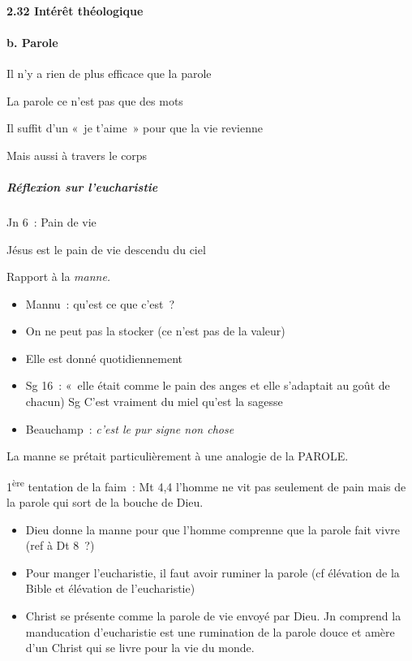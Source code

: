 \hypertarget{intuxe9ruxeat-thuxe9ologique}{%
\paragraph{2.32 Intérêt
théologique}\label{intuxe9ruxeat-thuxe9ologique}}

\hypertarget{b.-parole}{%
\paragraph{b. Parole}\label{b.-parole}}

Il n'y a rien de plus efficace que la parole

La parole ce n'est pas que des mots

Il suffit d'un «~je t'aime~» pour que la vie revienne

Mais aussi à travers le corps

\hypertarget{ruxe9flexion-sur-leucharistie}{%
\subparagraph{Réflexion sur
l'eucharistie}\label{ruxe9flexion-sur-leucharistie}}

Jn 6~: Pain de vie

Jésus est le pain de vie descendu du ciel

Rapport à la \emph{manne.}

\begin{itemize}
\item
  Mannu~: qu'est ce que c'est~?
\item
  On ne peut pas la stocker (ce n'est pas de la valeur)
\item
  Elle est donné quotidiennement
\item
  Sg 16~: «~elle était comme le pain des anges et elle s'adaptait au
  goût de chacun) Sg C'est vraiment du miel qu'est la sagesse
\item
  Beauchamp~: \emph{c'est le pur signe non chose}
\end{itemize}

La manne se prétait particulièrement à une analogie de la PAROLE.

1\textsuperscript{ère} tentation de la faim~: Mt 4,4 l'homme ne vit pas
seulement de pain mais de la parole qui sort de la bouche de Dieu.

\begin{itemize}
\item
  Dieu donne la manne pour que l'homme comprenne que la parole fait
  vivre (ref à Dt 8~?)
\item
  Pour manger l'eucharistie, il faut avoir ruminer la parole (cf
  élévation de la Bible et élévation de l'eucharistie)
\item
  Christ se présente comme la parole de vie envoyé par Dieu. Jn comprend
  la manducation d'eucharistie est une rumination de la parole douce et
  amère d'un Christ qui se livre pour la vie du monde.
\end{itemize}

